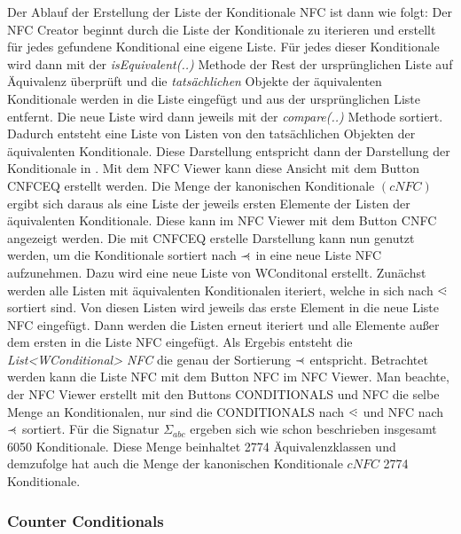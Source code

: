 \documentclass[12pt,a4paper]{article}
\newcommand\dotl{\mathrel{%
    \mathchoice{\QEQ}{\QEQ}{\QEQ}{\QEQ}%
}}
\def\QEQ{{%
    \setbox0\hbox{<}%
    \rlap{\hbox to \wd0{\hss \raisebox {0.1pt}{$\ \cdot$\hss}}}\box0
}}
\newcommand\rdotl{\mathrel{%
    \mathchoice{\RQEQ}{\RQEQ}{\RQEQ}{\RQEQ}%
}}
\def\RQEQ{{%
    \setbox0\hbox{$\prec$}%
    \rlap{\hbox to \wd0{\hss \raisebox {0.01pt}{$\ \cdot$\hss}}}\box0
}}
\begin{document}
Der Ablauf der Erstellung der Liste der Konditionale NFC ist dann wie folgt: Der NFC Creator beginnt durch die Liste der Konditionale zu iterieren und erstellt für jedes gefundene Konditional eine eigene Liste. Für jedes dieser Konditionale wird dann mit der \textit{isEquivalent(..)} Methode der Rest der ursprünglichen Liste auf Äquivalenz überprüft und die \textit{tatsächlichen} Objekte der äquivalenten Konditionale werden in die Liste eingefügt und aus der ursprünglichen Liste entfernt. Die neue Liste wird dann jeweils mit der \textit{compare(..)} Methode sortiert. Dadurch entsteht eine Liste von Listen von den tatsächlichen Objekten der äquivalenten Konditionale. Diese Darstellung entspricht dann der Darstellung der Konditionale in \cite{beierle19}. Mit dem NFC Viewer kann diese Ansicht mit dem Button CNFCEQ erstellt werden. Die Menge der kanonischen Konditionale $(cNFC)$ ergibt sich daraus als eine Liste der jeweils ersten Elemente der Listen der äquivalenten Konditionale. Diese kann im NFC Viewer mit dem Button CNFC angezeigt werden.
Die mit CNFCEQ erstelle Darstellung kann nun genutzt werden, um die Konditionale sortiert nach $\rdotl$ in eine neue Liste NFC aufzunehmen. Dazu wird eine neue Liste von WConditonal erstellt. Zunächst werden alle Listen mit äquivalenten Konditionalen iteriert, welche in sich nach $\dotl$ sortiert sind. Von diesen Listen wird jeweils das erste Element in die neue Liste NFC eingefügt. Dann werden die Listen erneut iteriert und alle Elemente außer dem ersten in die Liste NFC eingefügt. Als Ergebis entsteht die \textit{List<WConditional> NFC} die genau der Sortierung $\rdotl$ entspricht. Betrachtet werden kann die Liste NFC mit dem Button NFC im NFC Viewer. Man beachte, der NFC Viewer erstellt mit den Buttons CONDITIONALS und NFC die selbe Menge an Konditionalen, nur sind die CONDITIONALS nach $\dotl$ und NFC nach $\rdotl$ sortiert. Für die Signatur $\Sigma_{abc}$ ergeben sich wie schon beschrieben insgesamt 6050 Konditionale. Diese Menge beinhaltet 2774 Äquivalenzklassen und demzufolge hat auch die Menge der kanonischen Konditionale $cNFC$ 2774 Konditionale.





\subsubsection{Counter Conditionals}
\end{document}
